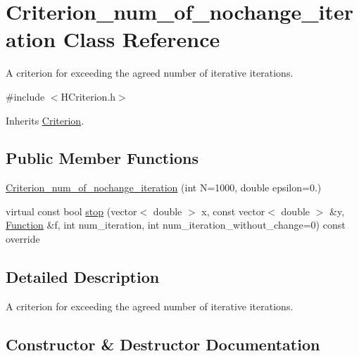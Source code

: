 \hypertarget{class_criterion__num__of__nochange__iteration}{}\section{Criterion\+\_\+num\+\_\+of\+\_\+nochange\+\_\+iteration Class Reference}
\label{class_criterion__num__of__nochange__iteration}


A criterion for exceeding the agreed number of iterative iterations.  




{\ttfamily \#include $<$H\+Criterion.\+h$>$}



Inherits \hyperlink{class_criterion}{Criterion}.

\subsection*{Public Member Functions}
\begin{DoxyCompactItemize}
\item 
\hyperlink{class_criterion__num__of__nochange__iteration_a5ce65c4857f296f061979d425521b05d}{Criterion\+\_\+num\+\_\+of\+\_\+nochange\+\_\+iteration} (int N=1000, double epsilon=0.)
\item 
virtual const bool \hyperlink{class_criterion__num__of__nochange__iteration_a7ced10cb8ce2f4979ae0d25287d91a40}{stop} (vector$<$ double $>$ x, const vector$<$ double $>$ \&y, \hyperlink{class_function}{Function} \&f, int num\+\_\+iteration, int num\+\_\+iteration\+\_\+without\+\_\+change=0) const override
\end{DoxyCompactItemize}


\subsection{Detailed Description}
A criterion for exceeding the agreed number of iterative iterations. 

\subsection{Constructor \& Destructor Documentation}
\mbox{\label{class_criterion__num__of__nochange__iteration_a5ce65c4857f296f061979d425521b05d}} 

